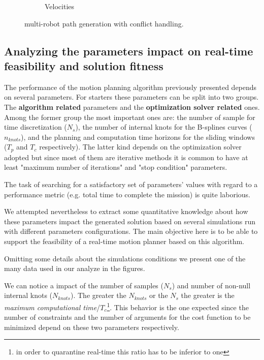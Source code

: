 \begin{figure}[!h]
\begin{subfigure}[b]{0.48\textwidth}
                \caption{Velocities}\label{fig:vnc}
        \end{subfigure}
        \caption{multi-robot path generation with conflict handling.}\label{fig:nc}
\end{figure}

\subsection{Analyzing the parameters impact on real-time feasibility and solution fitness}

The performance of the motion planning algorithm previously presented depends on several parameters. For starters these parameters can be split into two groups. The \textbf{algorithm related} parameters and the \textbf{optimization solver related} ones. Among the former group the most important ones are: the number of sample for time discretization ($N_s$), the number of internal knots for the B-splines curves ($n_{knots}$), and the planning and computation time horizons for the sliding windows ($T_p$ and $T_c$ respectively). The latter kind depends on the optimization solver adopted but since most of them are iterative methods it is common to have at least "maximum number of iterations" and "stop condition" parameters.

The task of searching for a satisfactory set of parameters' values with regard to a performance metric (e.g. total time to complete the mission) is quite laborious.

We attempted nevertheless to extract some quantitative knowledge about how these parameters impact the generated solution based on several simulations run with different parameters configurations. The main objective here is to be able to support the feasibility of a real-time motion planner based on this algorithm.

Omitting some details about the simulations conditions we present one of the many data used in our analyze in the figures. 

We can notice a impact of the number of samples ($N_s$) and number of non-null internal knots ($N_{knots}$). The greater the $N_{knots}$ or the $N_s$ the greater is the \textit{maximum computational time}/$T_c$\footnote{in order to quarantine real-time this ratio has to be inferior to one}. This behavior is the one expected since the number of constraints and the number of arguments for the cost function to be minimized depend on these two parameters respectively.


